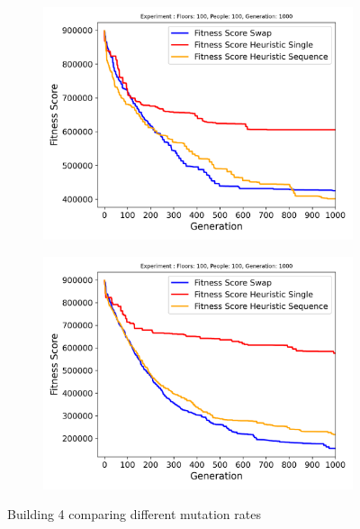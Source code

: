 \begin{figure}[h]
	\centering
	\begin{subfigure}[b]{0.49\linewidth}
		\centering
		\includegraphics[width=\linewidth]{results/Building4/Mutation_0.1/Floors: 100, People: 100, Generation: 1000_2_best.png}
		\label{fig:Building4/Mutation_0.1/Floors: 100, People: 100, Generation: 1000_2_best}
	\end{subfigure}
	\hfill
	\begin{subfigure}[b]{0.49\linewidth}
		\centering
		\includegraphics[width=\linewidth]{results/Building4/Mutation_0.6/Floors: 100, People: 100, Generation: 1000_best.png}
		\label{fig:Building4/Mutation_0.6/Floors: 100, People: 100, Generation: 1000_best}
	\end{subfigure}
	\hfill
	\caption{Building 4 comparing different mutation rates}
	\label{fig:Building 4 comparing different mutation rates}
\end{figure}


